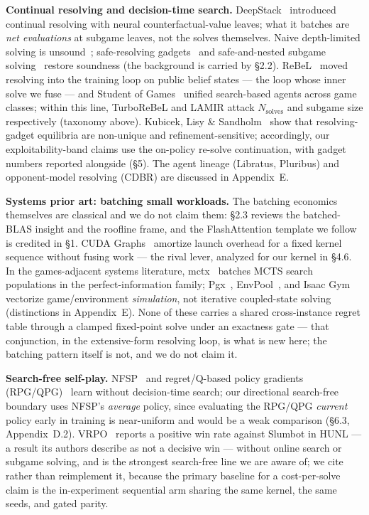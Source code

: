 \documentclass[11pt]{article}
\begin{document}
\textbf{Continual resolving and decision-time search.} DeepStack~\citep{Moravcik2017}
introduced continual resolving with neural counterfactual-value leaves; what it batches
are \emph{net evaluations} at subgame leaves, not the solves themselves. Naive
depth-limited solving is unsound~\citep{BrownSandholm2018}; safe-resolving
gadgets~\citep{Burch2014,Moravcik2016,Moravcik2017} and safe-and-nested subgame
solving~\citep{BrownSandholm2017} restore soundness (the background is carried by
\S2.2). ReBeL~\citep{Brown2020} moved resolving into the training loop on public belief
states --- the loop whose inner solve we fuse --- and Student of
Games~\citep{Schmid2023} unified search-based agents across game classes; within this
line, TurboReBeL and LAMIR attack $N_{\text{solves}}$ and subgame size respectively
(taxonomy above). Kubicek, Lisy \& Sandholm~\citep{Kubicek2026} show that
resolving-gadget equilibria are non-unique and refinement-sensitive; accordingly, our
exploitability-band claims use the on-policy re-solve continuation, with gadget numbers
reported alongside (\S5). The agent lineage (Libratus, Pluribus) and opponent-model
resolving (CDBR) are discussed in Appendix~E.

\textbf{Systems prior art: batching small workloads.} The batching economics themselves
are classical and we do not claim them: \S2.3 reviews the batched-BLAS insight and the
roofline frame, and the FlashAttention template we follow is credited in \S1. CUDA
Graphs~\citep{CUDAGraphs} amortize launch overhead for a fixed kernel sequence without
fusing work --- the rival lever, analyzed for our kernel in \S4.6. In the games-adjacent
systems literature, mctx~\citep{Danihelka2022} batches MCTS search populations in the
perfect-information family; Pgx~\citep{Koyamada2023}, EnvPool~\citep{Weng2022}, and
Isaac Gym~\citep{Makoviychuk2021} vectorize game/environment \emph{simulation}, not
iterative coupled-state solving (distinctions in Appendix~E). None of these carries a
shared cross-instance regret table through a clamped fixed-point solve under an
exactness gate --- that conjunction, in the extensive-form resolving loop, is what is
new here; the batching pattern itself is not, and we do not claim it.

\textbf{Search-free self-play.} NFSP~\citep{HeinrichSilver2016} and regret/Q-based
policy gradients (RPG/QPG)~\citep{Srinivasan2018} learn without decision-time search;
our directional search-free boundary uses NFSP's \emph{average} policy, since evaluating
the RPG/QPG \emph{current} policy early in training is near-uniform and would be a weak
comparison (\S6.3, Appendix~D.2). VRPO~\citep{VRPO} reports a positive win rate against
Slumbot in HUNL --- a result its authors describe as
not a decisive win --- without online search or subgame solving, and is the strongest
search-free line we are aware of; we cite rather than reimplement it, because the
primary baseline for a cost-per-solve claim is the in-experiment sequential arm
sharing the same kernel, the same seeds, and gated parity.
\end{document}
